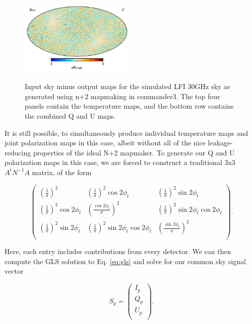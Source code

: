 \documentclass{aa}
\begin{document}
\begin{figure}
  \includegraphics[width=0.49\textwidth]{figs/sim_diff_U.pdf}\\
  \caption{Input sky minus output maps for the simulated LFI 30GHz sky as generated using n+2 mapmaking in commander3. The top four panels contain the temperature maps, and the bottom row contains the combined Q and U maps.}
  \label{fig:sim_diff}
\end{figure}

It is still possible, to simultaneously produce individual temperature maps and joint polarization maps in this case, albeit without all of the nice leakage-reducing properties of the ideal N+2 mapmaker. To generate our Q and U polarization maps in this case, we are forced to construct a traditional 3x3 $A^t N^{-1}A$ matrix, of the form

\begin{equation}
\begin{pmatrix}
(\frac{1}{\sigma})^2 &
(\frac{1}{\sigma})^2\cos2\phi_t & (\frac{1}{\sigma})^2\sin2\phi_t \\

(\frac{1}{\sigma})^2\cos2\phi_t & 
(\frac{\cos 2\phi_t}{\sigma})^2 & (\frac{1}{\sigma})^2\sin2\phi_t\cos2\phi_t \\

(\frac{1}{\sigma})^2\sin2\phi_t & 
(\frac{1}{\sigma})^2\sin2\phi_t\cos2\phi_t &(\frac{\sin2\phi_t}{\sigma})^2
\\
\end{pmatrix}
.
\end{equation}

Here, each entry includes contributions from every detector. We can then compute the GLS solution to Eq. \ref{eq:gls} and solve for our common sky signal vector 

\begin{equation}
S_p = \begin{pmatrix}
I_p\\
Q_p\\
U_p\\
\end{pmatrix}.
\end{equation}
\end{document}
